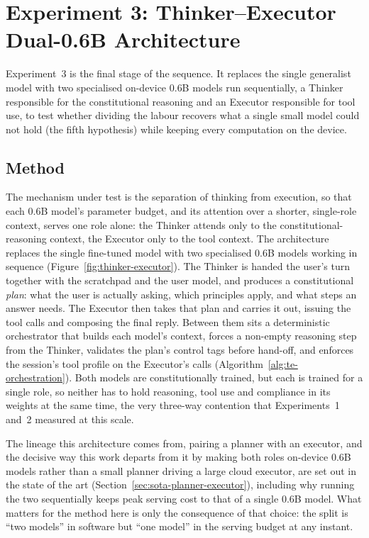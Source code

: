 \section{Experiment 3: Thinker--Executor Dual-0.6B Architecture}
\label{sec:mr-exp3}

Experiment~3 is the final stage of the sequence. It replaces the single generalist model with two specialised on-device 0.6B models run sequentially, a Thinker responsible for the constitutional reasoning and an Executor responsible for tool use, to test whether dividing the labour recovers what a single small model could not hold (the fifth hypothesis) while keeping every computation on the device.

\subsection{Method}
\label{subsec:mr-exp3-method}

The mechanism under test is the separation of thinking from execution, so that each 0.6B model's parameter budget, and its attention over a shorter, single-role context, serves one role alone: the Thinker attends only to the constitutional-reasoning context, the Executor only to the tool context. The architecture replaces the single fine-tuned model with two specialised 0.6B models working in sequence (Figure~\ref{fig:thinker-executor}). The Thinker is handed the user's turn together with the scratchpad and the user model, and produces a constitutional \emph{plan}: what the user is actually asking, which principles apply, and what steps an answer needs. The Executor then takes that plan and carries it out, issuing the tool calls and composing the final reply. Between them sits a deterministic orchestrator that builds each model's context, forces a non-empty reasoning step from the Thinker, validates the plan's control tags before hand-off, and enforces the session's tool profile on the Executor's calls (Algorithm~\ref{alg:te-orchestration}). Both models are constitutionally trained, but each is trained for a single role, so neither has to hold reasoning, tool use and compliance in its weights at the same time, the very three-way contention that Experiments~1 and~2 measured at this scale.

The lineage this architecture comes from, pairing a planner with an executor, and the decisive way this work departs from it by making both roles on-device 0.6B models rather than a small planner driving a large cloud executor, are set out in the state of the art (Section~\ref{sec:sota-planner-executor}), including why running the two sequentially keeps peak serving cost to that of a single 0.6B model. What matters for the method here is only the consequence of that choice: the split is ``two models'' in software but ``one model'' in the serving budget at any instant.

